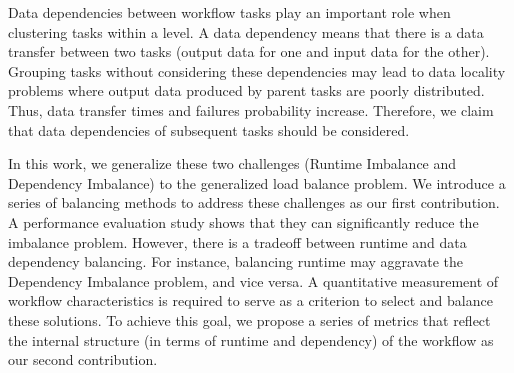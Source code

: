 \documentclass[final]{IEEEtran}
\begin{document}
Data dependencies between workflow tasks play an important role when clustering tasks within a level. A data dependency means that there is a data transfer between two tasks (output data for one and input data for the other). Grouping tasks without considering these dependencies may lead to data locality problems where output data produced by parent tasks are poorly distributed. Thus, data transfer times and failures probability increase.
Therefore, we claim that data dependencies of subsequent tasks should be considered.



In this work, we generalize these two challenges (Runtime Imbalance and Dependency Imbalance) to the generalized load balance problem. We introduce a series of balancing methods to address these challenges as our first contribution. A performance evaluation study shows that they can significantly reduce the imbalance problem.
However, there is a tradeoff between runtime and data dependency balancing. For instance, 
balancing runtime may aggravate the Dependency Imbalance problem, and vice versa. A quantitative measurement of workflow characteristics is required to serve as a criterion to select and balance these solutions. To achieve this goal, we propose a series of metrics that reflect the internal structure (in terms of runtime and dependency) of the workflow as our second contribution. 
\end{document}
